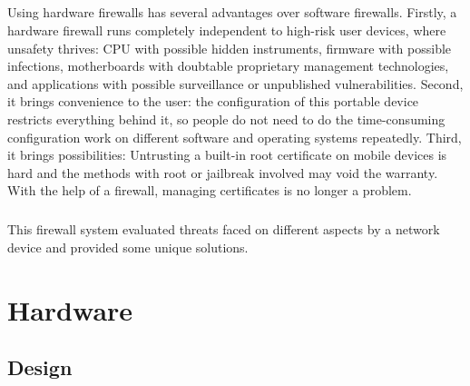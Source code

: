 \documentclass[mscthesis]{usiinfthesis}
\begin{document}
\paragraph{}
Using hardware firewalls has several advantages over software firewalls. Firstly, a hardware firewall runs completely independent to high-risk user devices, where unsafety thrives: CPU with possible hidden instruments, firmware with possible infections, motherboards with doubtable proprietary management technologies, and applications with possible surveillance or unpublished vulnerabilities. Second, it brings convenience to the user: the configuration of this portable device restricts everything behind it, so people do not need to do the time-consuming configuration work on different software and operating systems repeatedly. Third, it brings possibilities: Untrusting a built-in root certificate on mobile devices is hard and the methods with root or jailbreak involved may void the warranty. With the help of a firewall, managing certificates is no longer a problem.
\paragraph{}
This firewall system evaluated threats faced on different aspects by a network device and provided some unique solutions.

\chapter{Hardware}
\section{Design}
\end{document}
